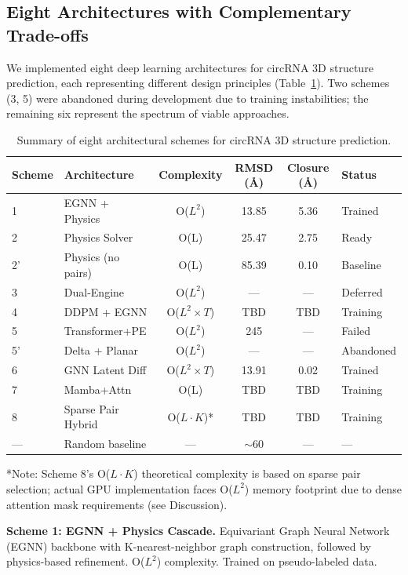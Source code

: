 \documentclass[12pt]{article}
\begin{document}
\subsection{Eight Architectures with Complementary Trade-offs}

We implemented eight deep learning architectures for circRNA 3D structure prediction, each representing different design principles (Table~\ref{tab:schemes}). Two schemes (3, 5) were abandoned during development due to training instabilities; the remaining six represent the spectrum of viable approaches.

\begin{table}[htbp]
\centering
\caption{Summary of eight architectural schemes for circRNA 3D structure prediction.}
\label{tab:schemes}
\begin{tabular}{llcccl}
\toprule
Scheme & Architecture & Complexity & RMSD (\AA) & Closure (\AA) & Status \\
\midrule
1 & EGNN + Physics & O($L^2$) & 13.85 & 5.36 & Trained \\
2 & Physics Solver & O(L) & 25.47 & 2.75 & Ready \\
2' & Physics (no pairs) & O(L) & 85.39 & 0.10 & Baseline \\
3 & Dual-Engine & O($L^2$) & --- & --- & Deferred \\
4 & DDPM + EGNN & O($L^2 \times T$) & TBD & TBD & Training \\
5 & Transformer+PE & O($L^2$) & 245 & --- & Failed \\
5' & Delta + Planar & O($L^2$) & --- & --- & Abandoned \\
6 & GNN Latent Diff & O($L^2 \times T$) & 13.91 & 0.02 & Trained \\
7 & Mamba+Attn & O(L) & TBD & TBD & Training \\
8 & Sparse Pair Hybrid & O($L \cdot K$)* & TBD & TBD & Training \\
\midrule
--- & Random baseline & --- & $\sim$60 & --- & --- \\
\bottomrule
\end{tabular}
\footnotesize
*Note: Scheme 8's O($L \cdot K$) theoretical complexity is based on sparse pair selection; actual GPU implementation faces O($L^2$) memory footprint due to dense attention mask requirements (see Discussion).
\end{table}

\textbf{Scheme 1: EGNN + Physics Cascade.} Equivariant Graph Neural Network (EGNN) \citep{satorras2021} backbone with K-nearest-neighbor graph construction, followed by physics-based refinement. O($L^2$) complexity. Trained on pseudo-labeled data.
\end{document}
